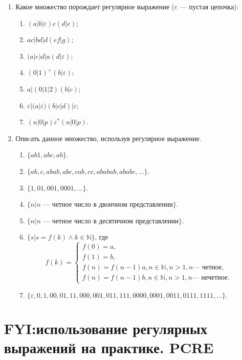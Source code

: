 \begin{enumerate}
    \item Какое множество порождает регулярное выражение ($\varepsilon$ --- пустая цепочка):
    \begin{enumerate}
        \item $(a|b|\varepsilon)c(d|e)$;
        \item $ac|bd|d(ef|g)$;
        \item $(a|c)d|a(d|\varepsilon)$;
        \item $(0|1)^+(b|\varepsilon)$;
        \item $a|(0|1|2)(b|c)$;
        \item $\varepsilon|(a|\varepsilon)(b|c|d)|\varepsilon$;
        \item $(n|0|p)\varepsilon^*(n|0|p)$.
    \end{enumerate}
    
    \item Опиcать данное множество, используя регулярное выражение.
    \begin{enumerate}
        \item $\{ab1,abc,ab\}$.
        \item $\{ab, c, abab, abc, cab, cc, ababab, ababc,\ldots\}$.
        \item $\{1,01,001,0001,\ldots\}$.
        \item $\{n|\text{$n$ --- четное число в двоичном представлении}\}$.
        \item $\{n|\text{$n$ --- четное число в десятичном представлении}\}$.
        \item $\{s|s=f(k)\land k\in\mathbb{N}\}$, где
        \[f(k)=
            \begin{cases}
                f(0)=a,\\
                f(1)=b,\\
                f(n)=f(n-1)a,n\in\mathbb{N},n>1,n\text{--- четное},\\
                f(n)=f(n-1)b,n\in\mathbb{N},n>1,n\text{--- нечетное}.
            \end{cases}
        \]
        \item $\{\varepsilon,0,1,00,01,11,000,001,011,111,0000,0001,0011,0111,1111,\ldots\}$.
    \end{enumerate}    
\end{enumerate}



\section{FYI:использование регулярных выражений на практике. PCRE}

